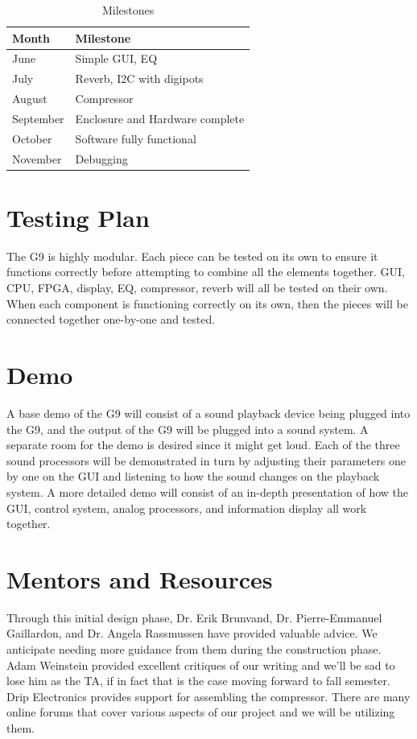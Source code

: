 \documentclass[journal]{IEEEtran}
\begin{document}
	\begin{table}[H]
		\centering
		\caption{Milestones}
		\label{tab:milestones}
		\begin{tabular}{l|l}
			Month     & Milestone                       \\ \hline
			June      & Simple GUI, EQ                  \\
			July      & Reverb, I2C with digipots       \\
			August    & Compressor                      \\
			September & Enclosure and Hardware complete \\
			October   & Software fully functional       \\
			November  & Debugging                      
		\end{tabular}
	\end{table}
	


	
	\section{Testing Plan}
	The G9 is highly modular. Each piece can be tested on its own to ensure it functions correctly before attempting to combine all the elements together. GUI, CPU, FPGA, display, EQ, compressor, reverb will all be tested on their own. When each component is functioning correctly on its own, then the pieces will be connected together one-by-one and tested.
	
	\section{Demo}
	A base demo of the G9 will consist of a sound playback device being plugged into the G9, and the output of the G9 will be plugged into a sound system. A separate room for the demo is desired since it might get loud. Each of the three sound processors will be demonstrated in turn by adjusting their parameters one by one on the GUI and listening to how the sound changes on the playback system. A more detailed demo will consist of an in-depth presentation of how the GUI, control system, analog processors, and information display all work together.
	
	\section{Mentors and Resources}
	Through this initial design phase, Dr. Erik Brunvand, Dr. Pierre-Emmanuel Gaillardon, and Dr. Angela Rassmussen have provided valuable advice. We anticipate needing more guidance from them during the construction phase. Adam Weinstein provided excellent critiques of our writing and we'll be sad to lose him as the TA, if in fact that is the case moving forward to fall semester. Drip Electronics provides support for assembling the compressor. There are many online forums that cover various aspects of our project and we will be utilizing them.
	
\end{document}
